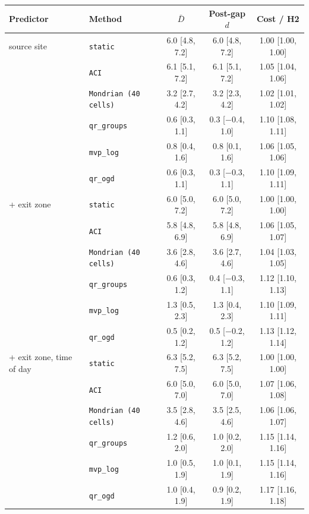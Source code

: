 \begin{tabular}{@{}llccc@{}}
\toprule
Predictor & Method & $\bar{D}$ & Post-gap $d$ & Cost / H2 \\
\midrule
source site & \texttt{static} & 6.0 [4.8, 7.2] & 6.0 [4.8, 7.2] & 1.00 [1.00, 1.00] \\
 & \texttt{ACI} & 6.1 [5.1, 7.2] & 6.1 [5.1, 7.2] & 1.05 [1.04, 1.06] \\
 & \texttt{Mondrian (40 cells)} & 3.2 [2.7, 4.2] & 3.2 [2.3, 4.2] & 1.02 [1.01, 1.02] \\
 & \texttt{qr\_groups} & 0.6 [0.3, 1.1] & 0.3 [$-$0.4, 1.0] & 1.10 [1.08, 1.11] \\
 & \texttt{mvp\_log} & 0.8 [0.4, 1.6] & 0.8 [0.1, 1.6] & 1.06 [1.05, 1.06] \\
 & \texttt{qr\_ogd} & 0.6 [0.3, 1.1] & 0.3 [$-$0.3, 1.1] & 1.10 [1.09, 1.11] \\
\addlinespace
+ exit zone & \texttt{static} & 6.0 [5.0, 7.2] & 6.0 [5.0, 7.2] & 1.00 [1.00, 1.00] \\
 & \texttt{ACI} & 5.8 [4.8, 6.9] & 5.8 [4.8, 6.9] & 1.06 [1.05, 1.07] \\
 & \texttt{Mondrian (40 cells)} & 3.6 [2.8, 4.6] & 3.6 [2.7, 4.6] & 1.04 [1.03, 1.05] \\
 & \texttt{qr\_groups} & 0.6 [0.3, 1.2] & 0.4 [$-$0.3, 1.1] & 1.12 [1.10, 1.13] \\
 & \texttt{mvp\_log} & 1.3 [0.5, 2.3] & 1.3 [0.4, 2.3] & 1.10 [1.09, 1.11] \\
 & \texttt{qr\_ogd} & 0.5 [0.2, 1.2] & 0.5 [$-$0.2, 1.2] & 1.13 [1.12, 1.14] \\
\addlinespace
+ exit zone, time of day & \texttt{static} & 6.3 [5.2, 7.5] & 6.3 [5.2, 7.5] & 1.00 [1.00, 1.00] \\
 & \texttt{ACI} & 6.0 [5.0, 7.0] & 6.0 [5.0, 7.0] & 1.07 [1.06, 1.08] \\
 & \texttt{Mondrian (40 cells)} & 3.5 [2.8, 4.6] & 3.5 [2.5, 4.6] & 1.06 [1.06, 1.07] \\
 & \texttt{qr\_groups} & 1.2 [0.6, 2.0] & 1.0 [0.2, 2.0] & 1.15 [1.14, 1.16] \\
 & \texttt{mvp\_log} & 1.0 [0.5, 1.9] & 1.0 [0.1, 1.9] & 1.15 [1.14, 1.16] \\
 & \texttt{qr\_ogd} & 1.0 [0.4, 1.9] & 0.9 [0.2, 1.9] & 1.17 [1.16, 1.18] \\

\end{tabular}
